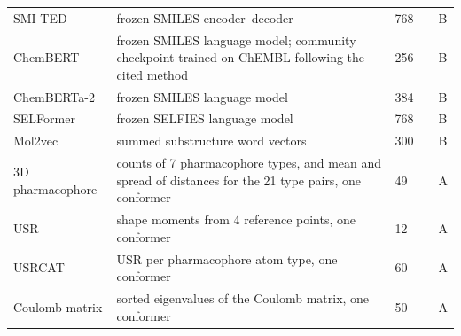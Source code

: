 \begin{longtable}{P{3.0cm}P{5.0cm}P{1.5cm}P{1.5cm}P{1.4cm}}
SMI-TED & frozen SMILES encoder--decoder & 768 & \citep{Soares2025} & B \\
ChemBERT & frozen SMILES language model; community checkpoint trained on ChEMBL following the cited method & 256 & \citep{Zhang2022ChemBERT} & B \\
ChemBERTa-2 & frozen SMILES language model & 384 & \citep{Ahmad2022} & B \\
SELFormer & frozen SELFIES language model & 768 & \citep{Yuksel2023} & B \\
Mol2vec & summed substructure word vectors & 300 & \citep{Jaeger2018} & B \\
3D pharmacophore & counts of 7 pharmacophore types, and mean and spread of distances for the 21 type pairs, one conformer & 49 & \citep{rdkit} & A \\
USR & shape moments from 4 reference points, one conformer & 12 & \citep{Ballester2007} & A \\
USRCAT & USR per pharmacophore atom type, one conformer & 60 & \citep{Schreyer2012} & A \\
Coulomb matrix & sorted eigenvalues of the Coulomb matrix, one conformer & 50 & \citep{Rupp2012} & A \\
\end{longtable}

